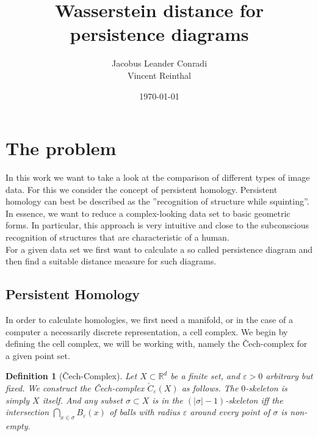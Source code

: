 \documentclass[11pt, a4paper, UKenglish]{article}
\author{Jacobus Leander Conradi\\Vincent Reinthal}
\date{\today}
\title{Wasserstein distance for persistence diagrams}
\newtheorem{definition}{Definition}
\newcommand{\bR}{\mathbb{R}}
\begin{document}
    \maketitle

    \thispagestyle{plain}
    \addtocounter{page}{-1}
    \tableofcontents
    \vfil\null
    \clearpage
    \thispagestyle{empty}\mbox{}
    \clearpage

    \section{The problem}\label{sec:the-problem}
    In this work we want to take a look at the comparison of different types of image data.
    For this we consider the concept of persistent homology.
    Persistent homology can best be described as the ''recognition of structure while squinting''.
    In essence, we want to reduce a complex-looking data set to basic geometric forms.
    In particular, this approach is very intuitive and close to the subconscious recognition of structures that are characteristic of a human.\\
    For a given data set we first want to calculate a so called persistence diagram and then find a suitable distance measure for such diagrams.


    \subsection{Persistent Homology}\label{subsec:persistent-homology}

    In order to calculate homologies, we first need a manifold, or in the case of a computer a necessarily discrete representation, a cell complex.
    We begin by defining the cell complex, we will be working with, namely the Čech-complex for a given point set.

    \begin{definition}[Čech-Complex]
        Let $X\subset \bR^d$ be a finite set, and $\varepsilon>0$ arbitrary but fixed.
        We construct the Čech-complex $\check C_\varepsilon(X)$ as follows.
        The $0$-skeleton is simply $X$ itself.
        And any subset $\sigma\subset X$ is in the $(|\sigma|-1)$-skeleton iff the intersection $\bigcap_{x\in\sigma}B_\varepsilon(x)$ of balls with radius $\varepsilon$ around every point of $\sigma$ is non-empty.
    \end{definition}
\end{document}
